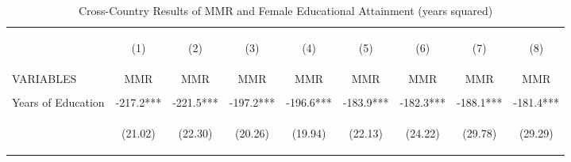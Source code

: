 \begin{table}[htpb!]\begin{center}\caption{Cross-Country Results of MMR and Female Educational Attainment (years squared)}\label{MMRtab:MMRyrssq}\begin{tabular}{lcccccccc}\toprule&\begin{footnotesize}(1)\end{footnotesize}&\begin{footnotesize}(2)\end{footnotesize}&\begin{footnotesize}(3)\end{footnotesize}&\begin{footnotesize}(4)\end{footnotesize}&\begin{footnotesize}(5)\end{footnotesize}&\begin{footnotesize}(6)\end{footnotesize}&\begin{footnotesize}(7)\end{footnotesize}&\begin{footnotesize}(8) \end{footnotesize}\\
VARIABLES&MMR&MMR&MMR&MMR&MMR&MMR&MMR&MMR\\ \midrule
&&&&&&&&\\
Years of Education&-217.2***&-221.5***&-197.2***&-196.6***&-183.9***&-182.3***&-188.1***&-181.4***\\
&\begin{footnotesize}(21.02)\end{footnotesize}&\begin{footnotesize}(22.30)\end{footnotesize}&\begin{footnotesize}(20.26)\end{footnotesize}&\begin{footnotesize}(19.94)\end{footnotesize}&\begin{footnotesize}(22.13)\end{footnotesize}&\begin{footnotesize}(24.22)\end{footnotesize}&\begin{footnotesize}(29.78)\end{footnotesize}&\begin{footnotesize}(29.29)\end{footnotesize}\\

\end{tabular}
\end{center}
\end{table}
